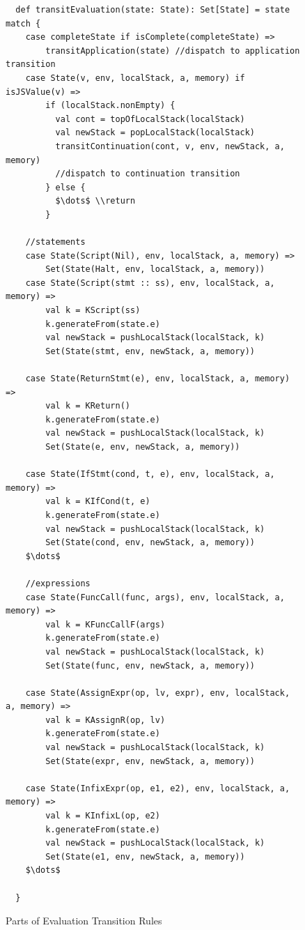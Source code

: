 \documentclass{article}
\begin{document}
\begin{figure}
\lstset{language=Scala, mathescape}
\begin{lstlisting}
  def transitEvaluation(state: State): Set[State] = state match {
    case completeState if isComplete(completeState) =>
        transitApplication(state) //dispatch to application transition
    case State(v, env, localStack, a, memory) if isJSValue(v) =>
        if (localStack.nonEmpty) {
          val cont = topOfLocalStack(localStack)
          val newStack = popLocalStack(localStack)
          transitContinuation(cont, v, env, newStack, a, memory)
          //dispatch to continuation transition
        } else {
          $\dots$ \\return
        }

    //statements
    case State(Script(Nil), env, localStack, a, memory) =>
        Set(State(Halt, env, localStack, a, memory))
    case State(Script(stmt :: ss), env, localStack, a, memory) =>
        val k = KScript(ss)
        k.generateFrom(state.e)
        val newStack = pushLocalStack(localStack, k)
        Set(State(stmt, env, newStack, a, memory))

    case State(ReturnStmt(e), env, localStack, a, memory) =>
        val k = KReturn()
        k.generateFrom(state.e)
        val newStack = pushLocalStack(localStack, k)
        Set(State(e, env, newStack, a, memory))

    case State(IfStmt(cond, t, e), env, localStack, a, memory) =>
        val k = KIfCond(t, e)
        k.generateFrom(state.e)
        val newStack = pushLocalStack(localStack, k)
        Set(State(cond, env, newStack, a, memory))
    $\dots$

    //expressions
    case State(FuncCall(func, args), env, localStack, a, memory) =>
        val k = KFuncCallF(args)
        k.generateFrom(state.e)
        val newStack = pushLocalStack(localStack, k)
        Set(State(func, env, newStack, a, memory))

    case State(AssignExpr(op, lv, expr), env, localStack, a, memory) =>
        val k = KAssignR(op, lv)
        k.generateFrom(state.e)
        val newStack = pushLocalStack(localStack, k)
        Set(State(expr, env, newStack, a, memory))

    case State(InfixExpr(op, e1, e2), env, localStack, a, memory) =>
        val k = KInfixL(op, e2)
        k.generateFrom(state.e)
        val newStack = pushLocalStack(localStack, k)
        Set(State(e1, env, newStack, a, memory))
    $\dots$

  }
\end{lstlisting}
\caption{Parts of Evaluation Transition Rules}
\label{fig:eval}
\end{figure}
\end{document}
